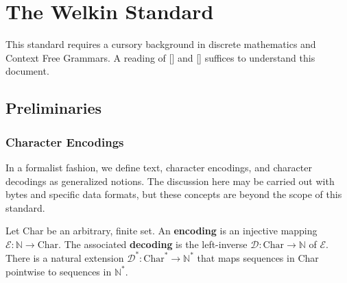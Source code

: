 
\chapter{The Welkin Standard}

This standard requires a cursory background in discrete mathematics and Context Free Grammars. A reading of [] and [] suffices to understand this document.

\section{Preliminaries}

\newcommand*{\chars}{\mathrm{CHAR}}
\newcommand*{\numbers}{\mathrm{NUMBER}}
\newcommand*{\whitespaces}{\mathrm{WHITE\_SPACES}}
\newcommand*{\reserved}{\mathrm{RESERVED}}
\newcommand*{\strings}{\mathrm{STRING}}
\newcommand*{\term}{\mathrm{term}}
\newcommand*{\terms}{\mathrm{terms}}
\newcommand*{\delimiters}{\mathrm{DELIMITERS}}
\newcommand*{\encoding}{\mathcal{E}}
\newcommand*{\decoding}{\mathcal{D}}

\newcommand*{\scope}{\textrm{scope}}

\subsection{Character Encodings}
In a formalist fashion, we define text, character encodings, and character decodings as generalized notions. The discussion here may be carried out with bytes and specific data formats, but these concepts are beyond the scope of this standard.

Let Char be an arbitrary, finite set. An \textbf{encoding} is an injective mapping $\encoding : \mathbb{N} \to \textrm{Char}.$ The associated \textbf{decoding} is the left-inverse $\decoding: \mathrm{Char} \to \mathbb{N}$ of $\encoding.$ There is a natural extension $\decoding^{*}: \textrm{Char}^{*} \to \mathbb{N}^{*}$
that maps sequences in Char pointwise to sequences in $\mathbb{N}^{*}.$

